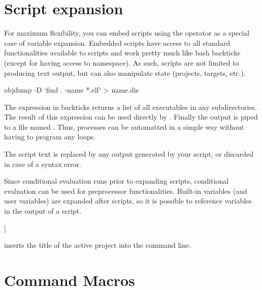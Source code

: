 \section{Script expansion}

For maximum flexibility, you can embed scripts using the \codeline{[[ ]]} operator as a special case of variable expansion. Embedded scripts have access to all standard functionalities available to scripts and work pretty much like bash backticks (except for having access to \codeblocks namespace). As such, scripts are not limited to producing text output, but can also manipulate \codeblocks state (projects, targets, etc.).



\begin{cmd}
objdump -D `find . -name *.elf` > name.dis
\end{cmd}

The expression in backticks returns a list of all executables  in any subdirectories. The result of this expression can be used directly by . Finally the output is piped to a file named  . Thus, processes can be automatted in a simple way without having to program any loops.


The script text is replaced by any output generated by your script, or discarded in case of a syntax error.

Since conditional evaluation runs prior to expanding scripts, conditional evaluation can be used for preprocessor functionalities. Built-in variables (and user variables) are expanded after scripts, so it is possible to reference variables in the output of a script.

\begin{code}
[[ print(GetProjectManager().GetActiveProject().GetTitle()); ]]
\end{code}

inserts the title of the active project into the command line.

\section{Command Macros}\label{sec:command_macros}


